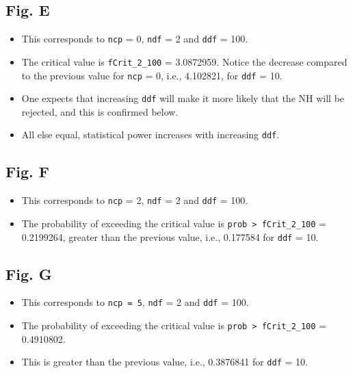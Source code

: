 \documentclass[
]{book}
\providecommand{\tightlist}{%
  \setlength{\itemsep}{0pt}\setlength{\parskip}{0pt}}
\begin{document}
\hypertarget{fig.-e}{%
\subsection{Fig. E}\label{fig.-e}}

\begin{itemize}
\tightlist
\item
  This corresponds to \texttt{ncp} = 0, \texttt{ndf} = 2 and \texttt{ddf} = 100.
\item
  The critical value is \texttt{fCrit\_2\_100} = 3.0872959. Notice the decrease compared to the previous value for \texttt{ncp} = 0, i.e., 4.102821, for \texttt{ddf} = 10.
\item
  One expects that increasing \texttt{ddf} will make it more likely that the NH will be rejected, and this is confirmed below.
\item
  All else equal, statistical power increases with increasing \texttt{ddf}.
\end{itemize}

\hypertarget{fig.-f}{%
\subsection{Fig. F}\label{fig.-f}}

\begin{itemize}
\tightlist
\item
  This corresponds to \texttt{ncp} = 2, \texttt{ndf} = 2 and \texttt{ddf} = 100.
\item
  The probability of exceeding the critical value is \texttt{prob\ \textgreater{}\ fCrit\_2\_100} = 0.2199264, greater than the previous value, i.e., 0.177584 for \texttt{ddf} = 10.
\end{itemize}

\hypertarget{fig.-g}{%
\subsection{Fig. G}\label{fig.-g}}

\begin{itemize}
\tightlist
\item
  This corresponds to \texttt{ncp\ =\ 5}, \texttt{ndf} = 2 and \texttt{ddf} = 100.
\item
  The probability of exceeding the critical value is \texttt{prob\ \textgreater{}\ fCrit\_2\_100} = 0.4910802.
\item
  This is greater than the previous value, i.e., 0.3876841 for \texttt{ddf} = 10.
\end{itemize}
\end{document}
